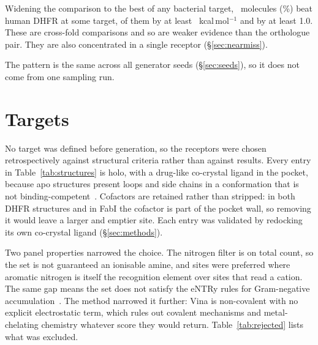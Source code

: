 \documentclass[11pt,a4paper]{article}
\begin{document}
Widening the comparison to the best of any bacterial target,
\selAnyN{}~molecules (\selAnyPct\%) beat human DHFR at some target,
\selAnyHalf{} of them by at least \marginMin{}~kcal\,mol$^{-1}$ and
\selAnyOne{} by at least 1.0. These are cross-fold comparisons and so are
weaker evidence than the orthologue pair. They are also concentrated in a
single receptor (\S\ref{sec:nearmiss}).

The pattern is the same across all \nSeeds{} generator seeds
(\S\ref{sec:seeds}), so it does not come from one sampling run.

\section{Targets}
\label{sec:targets}

No target was defined before generation, so the receptors were chosen
retrospectively against structural criteria rather than against results. Every
entry in Table~\ref{tab:structures} is holo, with a drug-like co-crystal
ligand in the pocket, because apo structures present loops and side chains in
a conformation that is not binding-competent~\cite{mcgovern2003}. Cofactors
are retained rather than stripped: in both DHFR structures and in FabI the
cofactor is part of the pocket wall, so removing it would leave a larger and
emptier site. Each entry was validated by redocking its own co-crystal ligand
(\S\ref{sec:methods}).

Two panel properties narrowed the choice. The nitrogen filter is on total
count, so the set is not guaranteed an ionisable amine, and sites were
preferred where aromatic nitrogen is itself the recognition element over sites
that read a cation. The same gap means the set does not satisfy the eNTRy
rules for Gram-negative accumulation~\cite{richter2017}. The method narrowed
it further: Vina is non-covalent with no explicit electrostatic term, which
rules out covalent mechanisms and metal-chelating chemistry whatever score
they would return. Table~\ref{tab:rejected} lists what was excluded.
\end{document}
